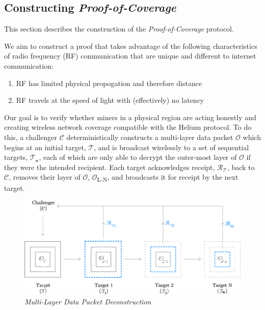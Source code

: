 \documentclass[letterpaper,11pt]{article}
\def\proofofcoverage/{\textit{Proof-of-Coverage}}
\begin{document}
\subsection{Constructing \proofofcoverage/}

This section describes the construction of the \proofofcoverage/ protocol.\newline

We aim to construct a proof that takes advantage of the following characteristics of radio frequency (RF) communication that are unique and different to internet communication:

\begin{enumerate}
	\item RF has limited physical propogation and therefore distance
	\item RF travels at the speed of light with (effectively) no latency
\end{enumerate}

Our goal is to verify whether miners in a physical region are acting honestly and creating wireless network coverage compatible with the Helium protocol. To do this, a challenger $\mathcal{C}$ deterministically constructs a multi-layer data packet $\mathcal{O}$ which begins at an initial target, $\mathcal{T}$, and is broadcast wirelessly to a set of sequential targets, $\mathcal{T_n}$, each of which are only able to decrypt the outer-most layer of $\mathcal{O}$ if they were the intended recipient. Each target acknowledges receipt, $\mathcal{R_T}$, back to $\mathcal{C}$, removes their layer of $\mathcal{O}$, $\mathcal{O}$\textsubscript{L-N}, and broadcasts it for receipt by the next target. \newline

\begin{figure}[H]
	\begin{center}
  		\includegraphics[width=\textwidth]{diagram2.eps}
  		\caption{\textit{Multi-Layer Data Packet Deconstruction}}
  		\label{fig:poc-construction}
 	\end{center}
\end{figure}
\end{document}
